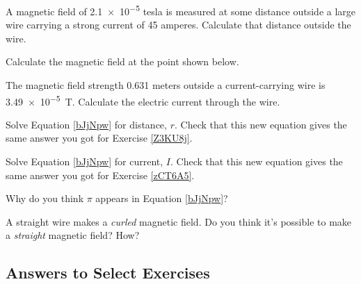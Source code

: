 \documentclass[main.tex]{subfiles}
\begin{document}
\begin{exercise} \label{Z3KU8j}
    A magnetic field of \num{2.1e-5} tesla is measured at some distance outside a large wire carrying a strong current of 45 amperes. Calculate that distance outside the wire.
\end{exercise}

\begin{exercise} \label{toCeii}
    Calculate the magnetic field at the point shown below.

\begin{center}
\end{center}
\end{exercise}

\begin{exercise} \label{zCT6A5}
    The magnetic field strength 0.631 meters outside a current-carrying wire is \SI{3.49e-5}{T}. Calculate the electric current through the wire.
\end{exercise}

\begin{exercise}
    Solve Equation \ref{bJjNpw} for distance, $r$. Check that this new equation gives the same answer you got for Exercise \ref{Z3KU8j}. 
\end{exercise}

\begin{exercise}
    Solve Equation \ref{bJjNpw} for current, $I$. Check that this new equation gives the same answer you got for Exercise \ref{zCT6A5}. 
\end{exercise}

\begin{exercise}
    Why do you think $\pi$ appears in Equation \ref{bJjNpw}?
\end{exercise}

\begin{exercise}
A straight wire makes a \textit{curled} magnetic field. Do you think it's possible to make a \textit{straight} magnetic field? How?
\end{exercise}

\clearpage

\subsection*{Answers to Select Exercises}
\end{document}
